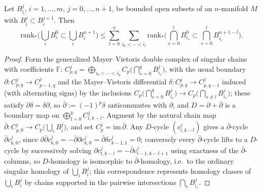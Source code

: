 \begin{lemma}
  \label{lem:pet-ch12-mayer-vietoris-rank}
  Let $B_i^j$, $i=1,\dots,m$, $j=0,\dots,n+1$, be bounded open subsets of an
  $n$-manifold $M$ with $\overline{B_i^j}\subset B_i^{j+1}$. Then
  \[
    \mathrm{rank}_*\Big(\bigcup_iB_i^0\subset\bigcup_iB_i^{n+1}\Big)
    \le\sum_{l=0}^{n}\sum_{i_0<\cdots<i_l}
    \mathrm{rank}_*\Big(\bigcap_{s=0}^lB_{i_s}^0\subset\bigcap_{s=0}^lB_{i_s}^{n+1-l}\Big).
  \]
\end{lemma}
\begin{proof}
  Form the generalized Mayer--Vietoris double complex of singular chains with
  coefficients $\mathbb{F}$: $C_{p,q}^j=\bigoplus_{i_0<\cdots<i_q}C_p\big(\bigcap_{s=0}^qB_{i_s}^j\big)$,
  with the usual boundary $\partial:C_{p,q}^j\to C_{p-1,q}^j$ and the
  Mayer--Vietoris differential $\delta:C_{p,q}^j\to C_{p,q-1}^j$ induced (with
  alternating signs) by the inclusions
  $C_p\big(\bigcap_{s=0}^qB_{i_s}^j\big)\to C_p\big(\bigcap_{s\ne l}B_{i_s}^j\big)$;
  these satisfy $\partial\delta=\delta\partial$, so
  $\bar\partial:=(-1)^p\delta$ anticommutes with $\partial$, and
  $D=\partial+\bar\partial$ is a boundary map on
  $\bigoplus_{l=0}^kC^j_{l,k-l}$. Augment by the natural chain map
  $\bar\partial:C^j_{p,0}\to C_p\big(\bigcup_iB_i^j\big)$, and set
  $C_p^j=\mathrm{im}\,\bar\partial$. Any $D$-cycle $(c_{l,k-l}^j)$ gives a
  $\bar\partial$-cycle $\bar\partial c_{k,0}^j$, since
  $\partial\bar\partial c_{k,0}^j=-\bar\partial\partial c_{k,0}^j=\bar\partial\delta
  c_{k-1,1}^j=0$; conversely every $\bar\partial$-cycle lifts to a $D$-cycle by
  successively solving $\partial c_{l,k-l}^j=-\bar\partial c_{l-1,k-l+1}^j$
  using exactness of the $\bar\partial$-columns, so $D$-homology is isomorphic
  to $\bar\partial$-homology, i.e.\ to the ordinary singular homology of
  $\bigcup_iB_i^j$; this correspondence represents homology classes of
  $\bigcup_iB_i^j$ by chains supported in the pairwise intersections
  $\bigcap_sB_{i_s}^j$.


\end{proof}
